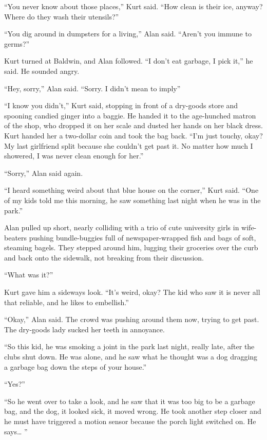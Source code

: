 ``You never know about those places,'' Kurt said.  ``How clean is
their ice, anyway?  Where do they wash their utensils?''

``You dig around in dumpsters for a living,'' Alan said.  ``Aren't you
immune to germs?''

Kurt turned at Baldwin, and Alan followed.  ``I don't eat garbage, I
pick it,'' he said.  He sounded angry.

``Hey, sorry,'' Alan said.  ``Sorry.  I didn't mean to imply\dash{}''

``I know you didn't,'' Kurt said, stopping in front of a dry-goods
store and spooning candied ginger into a baggie.  He handed it to the
age-hunched matron of the shop, who dropped it on her scale and dusted
her hands on her black dress.  Kurt handed her a two-dollar coin and
took the bag back.  ``I'm just touchy, okay?  My last girlfriend split
because she couldn't get past it.  No matter how much I showered, I
was never clean enough for her.''

``Sorry,'' Alan said again.

``I heard something weird about that blue house on the corner,'' Kurt
said.  ``One of my kids told me this morning, he saw something last
night when he was in the park.''

Alan pulled up short, nearly colliding with a trio of cute university
girls in wife-beaters pushing bundle-buggies full of newspaper-wrapped
fish and bags of soft, steaming bagels.  They stepped around him,
lugging their groceries over the curb and back onto the sidewalk, not
breaking from their discussion.

``What was it?''

Kurt gave him a sideways look.  ``It's weird, okay?  The kid who saw
it is never all that reliable, and he likes to embellish.''

``Okay,'' Alan said.  The crowd was pushing around them now, trying to
get past.  The dry-goods lady sucked her teeth in annoyance.

``So this kid, he was smoking a joint in the park last night, really
late, after the clubs shut down.  He was alone, and he saw what he
thought was a dog dragging a garbage bag down the steps of your
house.''

``Yes?''

``So he went over to take a look, and he saw that it was too big to be
a garbage bag, and the dog, it looked sick, it moved wrong.  He took
another step closer and he must have triggered a motion sensor because
the porch light switched on.  He says\ldots{}  ''

